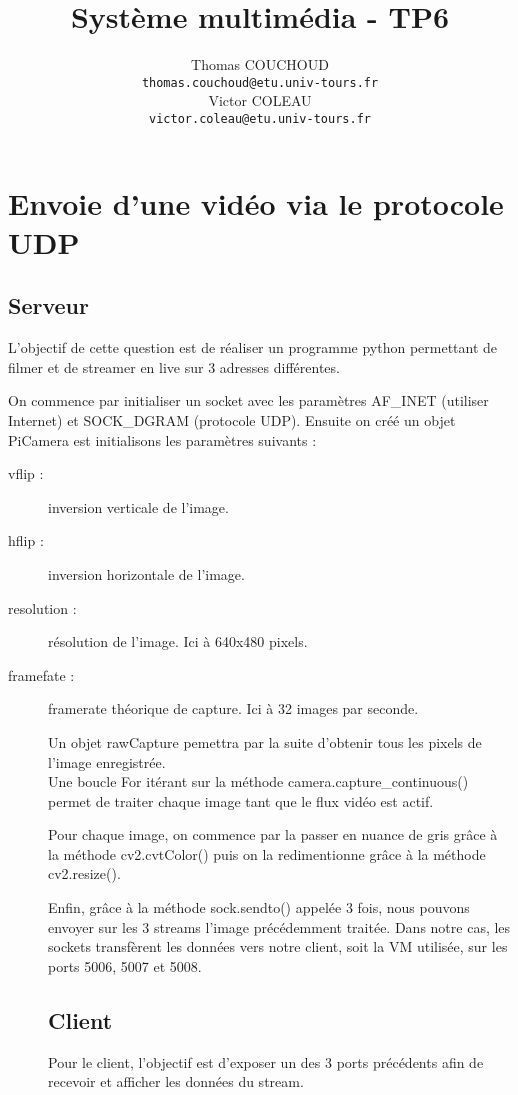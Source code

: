 \documentclass{report}
\title{Système multimédia - TP6}
\author{Thomas COUCHOUD\\\texttt{thomas.couchoud@etu.univ-tours.fr}\\Victor COLEAU\\\texttt{victor.coleau@etu.univ-tours.fr}}
\begin{document}
	\mccTitle

	\chapter{Envoie d’une vidéo via le protocole UDP}

	\section{Serveur}
		L'objectif de cette question est de réaliser un programme python permettant de filmer et de streamer en live sur 3 adresses différentes.

		On commence par initialiser un socket avec les paramètres AF_INET (utiliser Internet) et SOCK_DGRAM (protocole UDP).
		Ensuite on créé un objet PiCamera est initialisons les paramètres suivants :
\begin{description}
	\item[vflip :] inversion verticale de l'image.
	\item[hflip :] inversion horizontale de l'image.
	\item[resolution :] résolution de l'image. Ici à 640x480 pixels.
	\item[framefate :] framerate théorique de capture. Ici à 32 images par seconde.
\begin{description} 

		Un objet rawCapture pemettra par la suite d'obtenir tous les pixels de l'image enregistrée. \\

		Une boucle For itérant sur la méthode camera.capture_continuous() permet de traiter chaque image tant que le flux vidéo est actif.

		Pour chaque image, on commence par la passer en nuance de gris grâce à la méthode cv2.cvtColor() puis on la redimentionne grâce à la méthode cv2.resize().

		Enfin, grâce à la méthode sock.sendto() appelée 3 fois, nous pouvons envoyer sur les 3 streams l'image précédemment traitée. Dans notre cas, les sockets transfèrent les données vers notre client, soit la VM utilisée, sur les ports 5006, 5007 et 5008.

	\section{Client}
		Pour le client, l'objectif est d'exposer un des 3 ports précédents afin de recevoir et afficher les données du stream. \\


\end{description}
\end{description}
\end{document}
